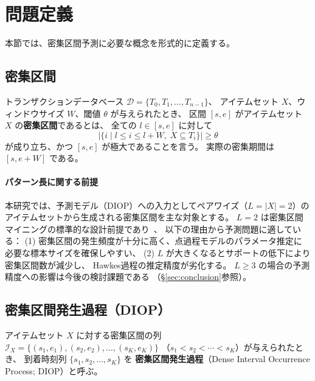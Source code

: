 \section{問題定義}\label{sec:problem}

本節では、密集区間予測に必要な概念を形式的に定義する。

\subsection{密集区間}

\begin{definition}[密集区間]
  トランザクションデータベース $\mathcal{D} = \{T_0, T_1, \ldots, T_{n-1}\}$、
  アイテムセット $X$、ウィンドウサイズ $W$、閾値 $\theta$ が与えられたとき、
  区間 $[s, e]$ がアイテムセット $X$ の\textbf{密集区間}であるとは、
  全ての $l \in [s, e]$ に対して
  \begin{equation}
    |\{i \mid l \leq i \leq l + W,\; X \subseteq T_i\}| \geq \theta
  \end{equation}
  が成り立ち、かつ $[s, e]$ が極大であることを言う。
  実際の密集期間は $[s, e + W]$ である。
\end{definition}

\paragraph{パターン長に関する前提}
本研究では、予測モデル（DIOP）への入力としてペアワイズ（$L = |X| = 2$）の
アイテムセットから生成される密集区間を主な対象とする。
$L=2$ は密集区間マイニングの標準的な設計前提であり~\cite{lancaster2018surges}、
以下の理由から予測問題に適している：
(1) 密集区間の発生頻度が十分に高く、点過程モデルのパラメータ推定に
必要な標本サイズを確保しやすい、
(2) $L$ が大きくなるとサポートの低下により密集区間数が減少し、
Hawkes過程の推定精度が劣化する。
$L \geq 3$ の場合の予測精度への影響は今後の検討課題である
（\S\ref{sec:conclusion}参照）。

\subsection{密集区間発生過程（DIOP）}

\begin{definition}[密集区間発生過程]
  アイテムセット $X$ に対する密集区間の列
  $\mathcal{I}_X = \{(s_1, e_1), (s_2, e_2), \ldots, (s_K, e_K)\}$
  （$s_1 < s_2 < \cdots < s_K$）が与えられたとき、
  到着時刻列 $\{s_1, s_2, \ldots, s_K\}$ を
  \textbf{密集区間発生過程}（Dense Interval Occurrence Process; DIOP）と呼ぶ。
\end{definition}

